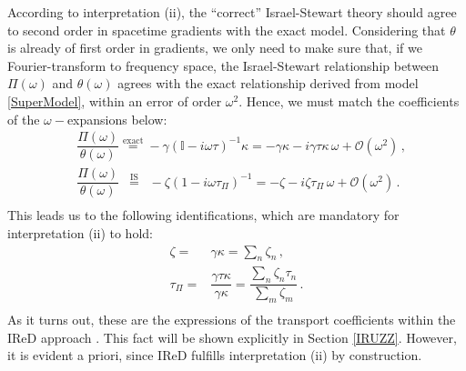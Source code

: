\documentclass[a4paper, amsfonts, amssymb, amsmath, reprint, showkeys, nofootinbib, twoside, onecolumn,notitlepage]{revtex4-2}
\begin{document}
According to interpretation (ii), the ``correct'' Israel-Stewart theory should agree to second order in spacetime gradients with the exact model. Considering that $\theta$ is already of first order in gradients, we only need to make sure that, if we Fourier-transform to frequency space, the Israel-Stewart relationship between $\Pi(\omega)$ and $\theta(\omega)$ agrees with the exact relationship derived from model \eqref{SuperModel}, within an error of order $\omega^2$. Hence, we must match the coefficients of the $\omega-$expansions below:
\begin{equation}\label{bornone}
\begin{split}
& \dfrac{\Pi(\omega)}{\theta(\omega)} \overset{\text{exact}}{=} -\gamma (\mathbb{I}{-}i\omega \tau)^{-1}\kappa  =-\gamma \kappa-i\gamma \tau \kappa \, \omega +\mathcal{O}(\omega^2) \, , \\
& \dfrac{\Pi(\omega)}{\theta(\omega)} \, \, \, \overset{\text{IS}}{=} \, \, \, -\zeta(1{-}i\omega \tau_\Pi)^{-1}  = -\zeta -i\zeta \tau_\Pi \, \omega +\mathcal{O}(\omega^2) \, . \\
\end{split}
\end{equation}
This leads us to the following identifications, which are mandatory for interpretation (ii) to hold:
\begin{equation}\label{MagicIRED}
\begin{split}
\zeta ={}& \gamma \kappa = \sum_n \zeta_n \, , \\
\tau_\Pi ={}& \dfrac{\gamma \tau \kappa}{\gamma \kappa} = \dfrac{\sum_n \zeta_n \tau_n}{\sum_m \zeta_m} \, . \\
\end{split}
\end{equation}
As it turns out, these are the expressions of the transport coefficients within the IReD approach \cite{WagnerIReD2022}. This fact will be shown explicitly in Section \ref{IRUZZ}. However, it is evident a priori, since IReD fulfills interpretation (ii) by construction. 
\end{document}
